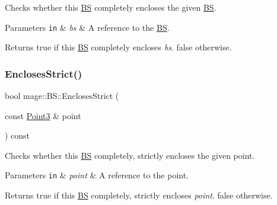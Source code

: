 Checks whether this \hyperlink{structmage_1_1_b_s}{BS} completely encloses the given \hyperlink{structmage_1_1_b_s}{BS}.


\begin{DoxyParams}[1]{Parameters}
\mbox{\tt in}  & {\em bs} & A reference to the \hyperlink{structmage_1_1_b_s}{BS}. \\
\hline
\end{DoxyParams}
\begin{DoxyReturn}{Returns}
{\ttfamily true} if this \hyperlink{structmage_1_1_b_s}{BS} completely encloses {\itshape bs}. {\ttfamily false} otherwise. 
\end{DoxyReturn}
\hypertarget{structmage_1_1_b_s_adcbd276fc5ecb48367b83da5a42defd4}{}\label{structmage_1_1_b_s_adcbd276fc5ecb48367b83da5a42defd4} 
\subsubsection{\texorpdfstring{Encloses\+Strict()}{EnclosesStrict()}\hspace{0.1cm}{\footnotesize\ttfamily [1/3]}}
{\footnotesize\ttfamily bool mage\+::\+B\+S\+::\+Encloses\+Strict (\begin{DoxyParamCaption}\item[{const \hyperlink{structmage_1_1_point3}{Point3} \&}]{point }\end{DoxyParamCaption}) const\hspace{0.3cm}{\ttfamily [noexcept]}}

Checks whether this \hyperlink{structmage_1_1_b_s}{BS} completely, strictly encloses the given point.


\begin{DoxyParams}[1]{Parameters}
\mbox{\tt in}  & {\em point} & A reference to the point. \\
\hline
\end{DoxyParams}
\begin{DoxyReturn}{Returns}
{\ttfamily true} if this \hyperlink{structmage_1_1_b_s}{BS} completely, strictly encloses {\itshape point}. {\ttfamily false} otherwise. 
\end{DoxyReturn}
\hypertarget{structmage_1_1_b_s_a5172470cadb43af2015e351ab6d4e8b6}{}\label{structmage_1_1_b_s_a5172470cadb43af2015e351ab6d4e8b6} 
